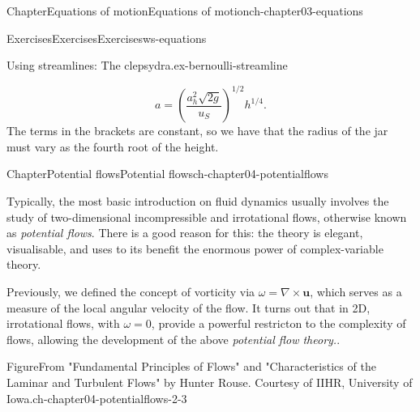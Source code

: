 \documentclass[oneside,10pt,]{book}
\numberwithin{equation}{section}
\newcommand{\bu}{\boldsymbol{u}}
\begin{document}
\begin{chapterptx}{Chapter}{Equations of motion}{}{Equations of motion}{}{}{ch-chapter03-equations}
\begin{exercises-section}{Exercises}{Exercises}{}{Exercises}{}{}{ws-equations}
\begin{divisionexercise}{8}{Using streamlines: The clepsydra.}{}{ex-bernoulli-streamline}
\begin{enumerate}[font=\bfseries,label=(\alph*),ref=\alph*]
\begin{equation*}
a=\left(\frac{a_h^2\sqrt{2g}}{u_S}\right)^{1/2} h^{1/4}.
\end{equation*}
The terms in the brackets are constant, so we have that the radius of the jar must vary as the fourth root of the height.%
\end{enumerate}%
\end{divisionexercise}%
\end{exercises-section}
\end{chapterptx}
%
%
\typeout{************************************************}
\typeout{************************************************}
%
\begin{chapterptx}{Chapter}{Potential flows}{}{Potential flows}{}{}{ch-chapter04-potentialflows}
\renewcommand*{\chaptername}{Chapter}
\begin{introduction}{}%
Typically, the most basic introduction on fluid dynamics usually involves the study of two-dimensional incompressible and irrotational flows, otherwise known as \emph{potential flows}. There is a good reason for this: the theory is elegant, visualisable, and uses to its benefit the enormous power of complex-variable theory.%
\par
Previously, we defined the concept of vorticity via \(\omega = \nabla \times \bu\), which serves as a measure of the local angular velocity of the flow. It turns out that in 2D, irrotational flows, with \(\omega = 0\), provide a powerful restricton to the complexity of flows, allowing the development of the above \emph{potential flow theory.}.%
\begin{figureptx}{Figure}{From "Fundamental Principles of Flows" and "Characteristics of the Laminar and Turbulent Flows" by Hunter Rouse. Courtesy of IIHR, University of Iowa.}{ch-chapter04-potentialflows-2-3}{}%
\begin{sidebyside}{2}{0.075}{0.075}{0.17}%
\begin{sbspanel}{0.47}%

\end{sbspanel}
\end{sidebyside}
\end{figureptx}
\end{introduction}
\end{chapterptx}
\end{document}
